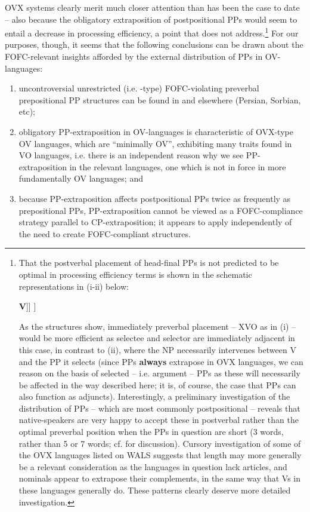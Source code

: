 \documentclass[output=paper]{LSP/langsci}
\begin{document}
OVX systems clearly merit much closer attention than has been the case to date – also because the obligatory extraposition of postpositional PPs would seem to entail a decrease in processing efficiency, a point that \citet{Hawkins2008} does not address.\footnote{That the postverbal placement of head-final PPs is not predicted to be optimal in processing efficiency terms is shown in the schematic representations in (i-ii) below: 

\begin{exe}
\ex\relax\upshape [\textsubscript{VP} [\textsubscript{PP} NP \textbf{P}] \textbf{V}]]
\ex\relax\upshape [\textsubscript{VP} \textbf{V} [\textsubscript{PP} NP \textbf{P}]]
\end{exe}

As the structures show, immediately preverbal placement – XVO as in (i) – would be more efficient as selectee and selector are immediately adjacent in this case, in contrast to (ii), where the NP necessarily intervenes between V and the PP it selects (since PPs \textbf{always} extrapose in OVX languages, we can reason on the basis of selected – i.e. argument – PPs as these will necessarily be affected in the way described here; it is, of course, the case that PPs can also function as adjuncts). Interestingly, a preliminary investigation of the distribution of  PPs – which are most commonly postpositional – reveals that native-speakers are very happy to accept these in postverbal rather than the optimal preverbal position when the PPs in {question} are short (3 words, rather than 5 or 7 words; cf. \citealt{Benson2016} for discussion). Cursory investigation of some of the OVX languages listed on WALS suggests that length may more generally be a relevant consideration as the languages in {question} lack articles, and nominals appear to extrapose their complements, in the same way that Vs in these languages generally do. These patterns clearly deserve more detailed investigation.} For our purposes, though, it seems that the following conclusions can be drawn about the FOFC-relevant insights afforded by the external distribution of PPs in OV-languages:


\begin{enumerate}[label*=({\roman*})]
\item 
uncontroversial unrestricted (i.e. -type) FOFC-violating preverbal prepositional PP structures can be found in  and elsewhere (Persian, Sorbian, etc);
\item 
obligatory PP-extraposition in OV-languages is characteristic of OVX-type OV languages, which are “minimally OV”, exhibiting many traits found in VO languages, i.e. there is an independent reason why we see PP-extraposition in the relevant languages, one which is not in {force} in more fundamentally OV languages; and
\item 
because PP-extraposition  affects postpositional PPs twice as frequently as prepositional PPs, PP-extraposition cannot be viewed as a FOFC-compliance strategy parallel to CP-extraposition; it appears to apply independently of the need to create FOFC-compliant structures.
\end{enumerate}
\end{document}
